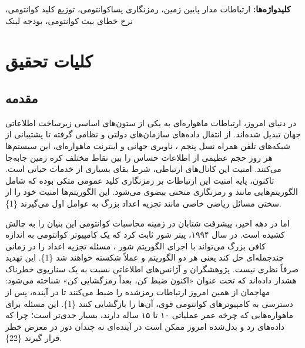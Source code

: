 \documentclass[a4paper,14pt]{extreport}
\begin{document}
\vspace{0.8cm}
\noindent\textbf{کلیدواژه‌ها:} ارتباطات مدار پایین زمین، رمزنگاری پساکوانتومی، توزیع کلید کوانتومی، نرخ خطای بیت کوانتومی، بودجه لینک

\chapter{کلیات تحقیق}
\setcounter{figure}{0}
\setcounter{table}{0}
\setcounter{equation}{0}

\section{مقدمه}

در دنیای امروز، ارتباطات ماهواره‌ای  به یکی از ستون‌های اساسی زیرساخت اطلاعاتی جهان تبدیل شده‌اند. از انتقال داده‌های سازمان‌های دولتی و نظامی گرفته تا پشتیبانی از شبکه‌های تلفن همراه نسل پنجم ، ناوبری جهانی  و اینترنت ماهواره‌ای، این سیستم‌ها هر روز حجم عظیمی از اطلاعات حساس را بین نقاط مختلف کره زمین جابه‌جا می‌کنند. امنیت این کانال‌های ارتباطی، شرط بقای بسیاری از خدمات حیاتی است. تاکنون، پایه امنیت این ارتباطات بر رمزنگاری کلید عمومی  متکی بوده که شامل الگوریتم‌هایی مانند  و رمزنگاری منحنی بیضوی  می‌شود. این الگوریتم‌ها امنیت خود را از سختی مسائل ریاضی خاصی مانند تجزیه اعداد بزرگ به عوامل اول  می‌گیرند \{1\}.

اما در دهه اخیر، پیشرفت شتابان در زمینه محاسبات کوانتومی  این بنیان را به چالش کشیده است. در سال ۱۹۹۴، پیتر شور  ثابت کرد که یک کامپیوتر کوانتومی به اندازه کافی بزرگ می‌تواند با اجرای الگوریتم شور ، مسئله تجزیه اعداد را در زمانی چندجمله‌ای حل کند یعنی هر دو الگوریتم  و  عملاً شکسته خواهند شد \{1\}. این تهدید صرفاً نظری نیست. پژوهشگران و آژانس‌های اطلاعاتی نسبت به یک سناریوی خطرناک هشدار داده‌اند که تحت عنوان «اکنون ضبط کن، بعداً رمزگشایی کن»  شناخته می‌شود: مهاجمان از همین امروز ارتباطات رمزشده را ضبط می‌کنند تا در آینده، پس از دسترسی به کامپیوترهای کوانتومی قوی، آن‌ها را بازگشایی کنند \{1\}. این مسئله برای ماهواره‌هایی که چرخه عمر عملیاتی ۱۰ تا ۱۵ ساله دارند، بسیار جدی‌تر است؛ چرا که داده‌های رد و بدل‌شده امروز ممکن است در آینده‌ای نه چندان دور در معرض خطر قرار گیرند \{22\}.
\end{document}
